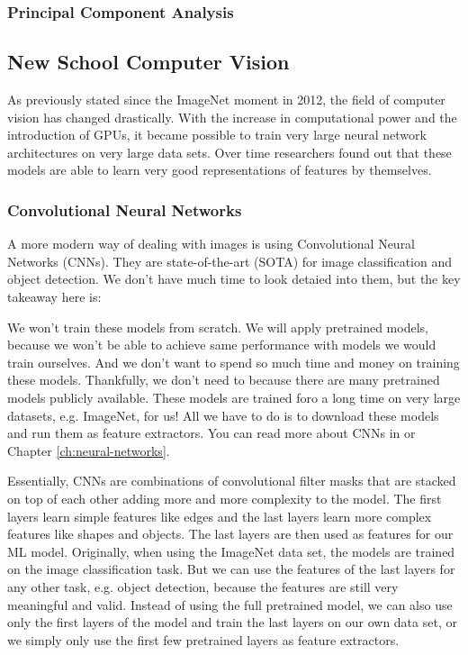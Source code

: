 \subsubsection{Principal Component Analysis}
\subsection{New School Computer Vision}
As previously stated since the ImageNet moment in 2012, the field of computer vision has changed drastically.
With the increase in computational power and the introduction of GPUs, it became possible to train very large neural network architectures on very large data sets.
Over time researchers found out that these models are able to learn very good representations of features by themselves.
\subsubsection{Convolutional Neural Networks}
A more modern way of dealing with images is using Convolutional Neural Networks (CNNs).
They are state-of-the-art (SOTA) for image classification and object detection.
We don't have much time to look detaied into them, but the key takeaway here is:

We won't train these models from scratch. We will apply pretrained models, because we won't
be able to achieve same performance with models we would train ourselves.
And we don't want to spend so much time and money on training these models.
Thankfully, we don't need to because there are many pretrained models publicly available.
These models are trained foro a long time on very large datasets, e.g. ImageNet\cite{deng2009imagenet}, for us!
All we have to do is to download these models and run them as feature extractors.
You can read more about CNNs in \cite{PhilippZettl:2022} or Chapter \ref{ch:neural-networks}.


Essentially, CNNs are combinations of convolutional filter masks that are stacked on top of each other adding more and more complexity to the model.
The first layers learn simple features like edges and the last layers learn more complex features like shapes and objects.
The last layers are then used as features for our ML model.
Originally, when using the ImageNet data set, the models are trained on the image classification task.
But we can use the features of the last layers for any other task, e.g. object detection, because the features are still very meaningful and valid.
Instead of using the full pretrained model, we can also use only the first layers of the model and train the last layers on our own data set, or we simply
only use the first few pretrained layers as feature extractors.

